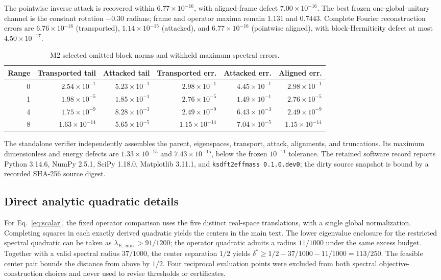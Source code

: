 \documentclass[11pt]{article}
\begin{document}
The pointwise inverse attack is recovered within $6.77\times10^{-16}$, with aligned-frame defect $7.00\times10^{-16}$. The best frozen one-global-unitary channel is the constant rotation $-0.30$ radians; frame and operator maxima remain $1.131$ and $0.7443$. Complete Fourier reconstruction errors are $6.76\times10^{-16}$ (transported), $1.14\times10^{-15}$ (attacked), and $6.77\times10^{-16}$ (pointwise aligned), with block-Hermiticity defect at most $4.50\times10^{-17}$.
\begin{table}[h]\centering\small\caption{M2 selected omitted block norms and withheld maximum spectral errors.}\begin{tabular}{rrrrrr}\toprule Range&Transported tail&Attacked tail&Transported err.&Attacked err.&Aligned err.\\\midrule
0&$2.54\times10^{-1}$&$5.23\times10^{-1}$&$2.98\times10^{-1}$&$4.45\times10^{-1}$&$2.98\times10^{-1}$\\1&$1.98\times10^{-5}$&$1.85\times10^{-1}$&$2.76\times10^{-5}$&$1.49\times10^{-1}$&$2.76\times10^{-5}$\\4&$1.75\times10^{-9}$&$8.28\times10^{-3}$&$2.49\times10^{-9}$&$6.43\times10^{-3}$&$2.49\times10^{-9}$\\8&$1.63\times10^{-14}$&$5.65\times10^{-5}$&$1.15\times10^{-14}$&$7.04\times10^{-5}$&$1.15\times10^{-14}$\\\bottomrule\end{tabular}\end{table}

The standalone verifier independently assembles the parent, eigenspaces, transport, attack, alignments, and truncations. Its maximum dimensionless and energy defects are $1.33\times10^{-15}$ and $7.43\times10^{-15}$, below the frozen $10^{-11}$ tolerance. The retained software record reports Python 3.14.6, NumPy 2.5.1, SciPy 1.18.0, Matplotlib 3.11.1, and \texttt{ksdft2effmass 0.1.0.dev0}; the dirty source snapshot is bound by a recorded SHA-256 source digest.

\subsection{Direct analytic quadratic details}
For Eq.~\eqref{eq:scalar}, the fixed operator comparison uses the five distinct real-space translations, with a single global normalization. Completing squares in each exactly derived quadratic yields the centers in the main text. The lower eigenvalue enclosure for the restricted spectral quadratic can be taken as $\lambda_{E,\min}>91/1200$; the operator quadratic admits a radius $11/1000$ under the same excess budget. Together with a valid spectral radius $37/1000$, the center separation $1/2$ yields $\delta^*\ge1/2-37/1000-11/1000=113/250$. The feasible center pair bounds the distance from above by $1/2$. Four reciprocal evaluation points were excluded from both spectral objective-construction choices and never used to revise thresholds or certificates.
\end{document}
